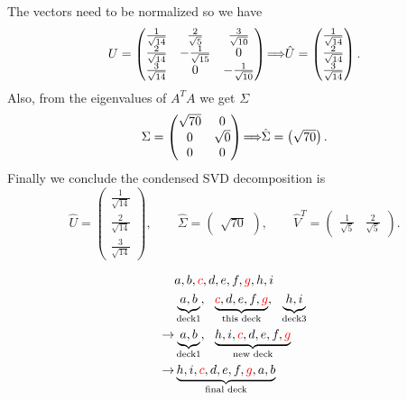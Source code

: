 \documentclass[12pt]{article}
\let\oldimplies\implies
\renewcommand*{\implies}{
	\hspace{-0.05cm}\resizebox{.95\width}{\height}{$\oldimplies$}\hspace{-0.05cm}
}
\begin{document}
 			The vectors need to be normalized so we have
 			$$ U = \begin{pmatrix}
 				\frac{1}{\sqrt{14}} & \frac{2}{\sqrt{5 }} & \frac{3}{\sqrt{10}} \\
 				\frac{2}{\sqrt{14}} & -\frac{1}{\sqrt{15}} & 0 \\
 				\frac{3}{\sqrt{14}} & 0 & -\frac{1}{\sqrt{10}}
 			\end{pmatrix} \implies \hat{U} = \begin{pmatrix}
 				\frac{1}{\sqrt{14}} \\ \frac{2}{\sqrt{14}} \\ \frac{3}{\sqrt{14}}
 			\end{pmatrix}.$$
 			Also, from the eigenvalues of $A^{T}A$ we get $\Sigma$
 			$$ \Sigma = \begin{pmatrix}
 				\sqrt{70} & 0 \\0 & \sqrt{0} \\ 0 & 0
 			\end{pmatrix} \implies \hat{\Sigma} = \begin{pmatrix}
 				\sqrt{70} 
 			\end{pmatrix}.$$
 			Finally we conclude the condensed SVD decomposition is 
 			$$ \hat{U} = \begin{pmatrix}
 			\frac{1}{\sqrt{14}} \\ \frac{2}{\sqrt{14}} \\ \frac{3}{\sqrt{14}}
 			\end{pmatrix}, \qquad \hat{\Sigma} = \begin{pmatrix}
 				\sqrt{70} 
 			\end{pmatrix}, \qquad \hat{V}^{T} = \begin{pmatrix}
 				\frac{1}{\sqrt{5}} & \frac{2}{\sqrt{5}} 
 			\end{pmatrix}.$$
 			
 			\begin{align*} 
 			&a,b,\textcolor{red}{c}, d, e, f, \textcolor{red}{g},h ,i \\
 			&\underbrace{a, b}_{\text{deck1}}, \ \  \underbrace{\textcolor{red}{c}, d, e, f, \textcolor{red}{g}}_{\text{this deck}}, \ \  \underbrace{h, i}_{\text{deck3}}\\ 
 			\to & \underbrace{a, b}_{\text{deck1}}, \ \ \underbrace{h, i,\textcolor{red}{c}, d, e, f, \textcolor{red}{g}}_{\text{new deck}} \\
 			\to& \underbrace{ h, i,\textcolor{red}{c}, d, e, f, \textcolor{red}{g},a,b }_{\text{final deck}} 
 			\end{align*}
\end{document}

